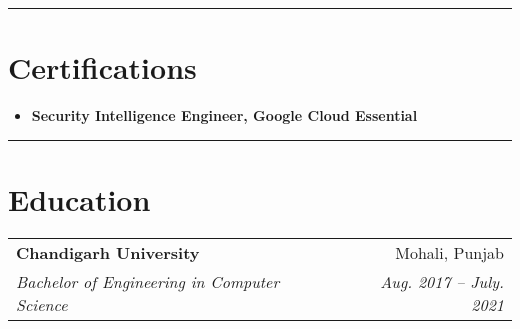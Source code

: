 \documentclass[letterpaper,11pt]{article}
\makeatletter
\newcommand{\resumeSection}[1]{
    \vspace{10pt}
    {\color{darkblue}\hrule}
    \vspace{-5pt}
    \section*{#1}
}
\newcommand{\resumeSubItem}[2]{
    \item \textbf{#1} #2
}
\newcommand{\resumeSubHeading}[4]{
    \vspace{-1pt}
    \item
    \begin{tabular*}{0.97\textwidth}[t]{l@{\extracolsep{\fill}}r}
        \textbf{#1} & #2 \\
        \textit{#3} & \textit{#4} \\
    \end{tabular*}
}
\makeatother
\begin{document}
\resumeSection{Certifications}
\begin{itemize}[left=0pt]
    \resumeSubItem{Security Intelligence Engineer, Google Cloud Essential}{} 
\end{itemize}

\resumeSection{Education}
\resumeSubHeading{Chandigarh University}{Mohali, Punjab}{Bachelor of Engineering in Computer Science}{Aug. 2017 – July. 2021}
\end{document}
